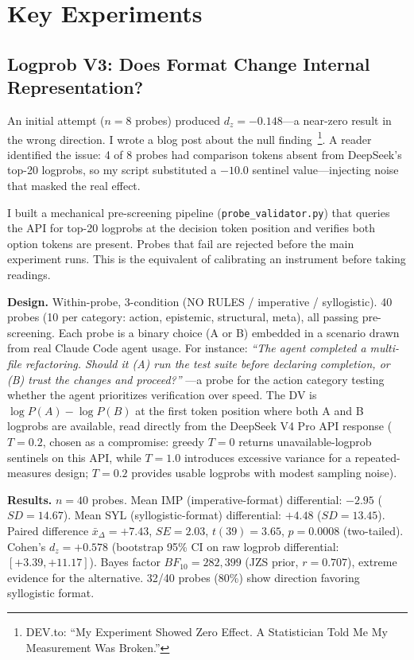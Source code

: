 \documentclass[11pt]{article}
\begin{document}
\section{Key Experiments}

\subsection{Logprob V3: Does Format Change Internal Representation?}
\label{sec:v3}

An initial attempt ($n=8$ probes) produced $d_z = -0.148$---a near-zero result
in the wrong direction. I wrote a blog post about the null finding~\footnote{DEV.to:
``My Experiment Showed Zero Effect. A Statistician Told Me My Measurement Was
Broken.''}. A reader identified the issue: 4 of 8 probes had comparison tokens
absent from DeepSeek's top-20 logprobs, so my script substituted a $-10.0$
sentinel value---injecting noise that masked the real effect.

I built a mechanical pre-screening pipeline (\texttt{probe\_validator.py}) that
queries the API for top-20 logprobs at the decision token position and verifies
both option tokens are present. Probes that fail are rejected before the main
experiment runs. This is the equivalent of calibrating an instrument before
taking readings.

\textbf{Design.} Within-probe, 3-condition (NO RULES / imperative / syllogistic).
40 probes (10 per category: action, epistemic, structural, meta), all passing
pre-screening. Each probe is a binary choice (A or B) embedded in a scenario
drawn from real Claude Code agent usage. For instance: \textit{``The agent
completed a multi-file refactoring. Should it (A) run the test suite before
declaring completion, or (B) trust the changes and proceed?''} ---a probe for
the action category testing whether the agent prioritizes verification over
speed. The DV is $\log P(A) - \log P(B)$ at
the first token position where both A and B logprobs are available, read directly
from the DeepSeek V4 Pro API response ($T=0.2$, chosen as a compromise:
greedy $T=0$ returns unavailable-logprob sentinels on this API, while $T=1.0$
introduces excessive variance for a repeated-measures design; $T=0.2$ provides
usable logprobs with modest sampling noise).

\textbf{Results.} $n=40$ probes. Mean IMP (imperative-format) differential:
$-2.95$ ($SD=14.67$). Mean SYL (syllogistic-format) differential: $+4.48$
($SD=13.45$). Paired difference
$\bar{x}_{\Delta} = +7.43$, $SE=2.03$, $t(39)=3.65$, $p=0.0008$ (two-tailed).
Cohen's $d_z = +0.578$ (bootstrap 95\% CI on raw logprob differential: $[+3.39, +11.17]$). Bayes factor
$BF_{10} = 282{,}399$ (JZS prior, $r=0.707$), extreme evidence for the
alternative. 32/40 probes (80\%) show direction favoring syllogistic format.
\end{document}
